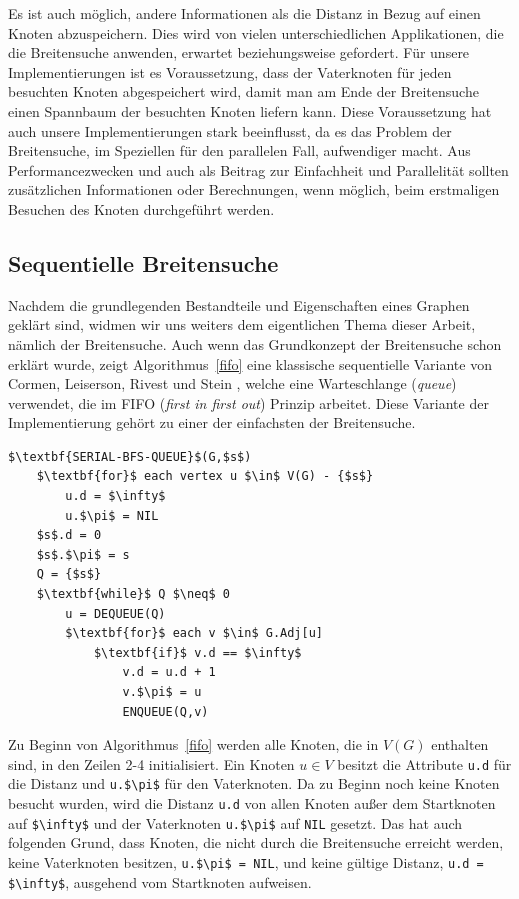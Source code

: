 \documentclass[11pt,a4paper]{article}
\begin{document}
Es ist auch möglich, andere Informationen als die Distanz in Bezug auf einen Knoten abzuspeichern. Dies wird von vielen unterschiedlichen Applikationen, die die Breitensuche anwenden, erwartet beziehungsweise gefordert. Für unsere Implementierungen ist es Voraussetzung, dass der Vaterknoten für jeden besuchten Knoten abgespeichert wird, damit man am Ende der Breitensuche einen Spannbaum der besuchten Knoten liefern kann. Diese Voraussetzung hat auch unsere Implementierungen stark beeinflusst, da es das Problem der Breitensuche, im Speziellen für den parallelen Fall, aufwendiger macht. Aus Performancezwecken und auch als Beitrag zur Einfachheit und Parallelität sollten zusätzlichen Informationen oder Berechnungen, wenn möglich, beim erstmaligen Besuchen des Knoten durchgeführt werden.
\subsection{Sequentielle Breitensuche}
Nachdem die grundlegenden Bestandteile und Eigenschaften eines Graphen geklärt sind, widmen wir uns weiters dem eigentlichen Thema dieser Arbeit, nämlich der Breitensuche. Auch wenn das Grundkonzept der Breitensuche schon erklärt wurde, zeigt Algorithmus~\ref{fifo} eine klassische sequentielle Variante von Cormen, Leiserson, Rivest und Stein \cite{cormen_introduction_2009}, welche eine Warteschlange (\textit{queue}) verwendet, die im FIFO (\textit{first in first out}) Prinzip arbeitet. Diese Variante der Implementierung gehört zu einer der einfachsten der Breitensuche.
\begin{lstlisting}[caption={Klassische Variante der Breitensuche unter Verwendung einer FIFO Warteschlange als Datenstruktur. Wird auf einem Graph \(G\) mit Startknoten \(s \in V(G)\) angewandt. Der Algorithmus bestimmt die Distanz und den Vaterknoten von denjenigen Knoten, die ausgehend vom Startknoten erreichbar sind.},label=fifo]
$\textbf{SERIAL-BFS-QUEUE}$(G,$s$)
	$\textbf{for}$ each vertex u $\in$ V(G) - {$s$}
		u.d = $\infty$
		u.$\pi$ = NIL
	$s$.d = 0
	$s$.$\pi$ = s
	Q = {$s$}
	$\textbf{while}$ Q $\neq$ 0
		u = DEQUEUE(Q)
		$\textbf{for}$ each v $\in$ G.Adj[u]
			$\textbf{if}$ v.d == $\infty$
				v.d = u.d + 1
				v.$\pi$ = u
				ENQUEUE(Q,v)
\end{lstlisting}
Zu Beginn von Algorithmus~\ref{fifo} werden alle Knoten, die in \(V(G)\) enthalten sind, in den Zeilen 2-4 initialisiert. Ein Knoten \(u \in V\) besitzt die Attribute \lstinline{u.d} für die Distanz und \lstinline{u.$\pi$} für den Vaterknoten. Da zu Beginn noch keine Knoten besucht wurden, wird die Distanz \lstinline{u.d} von allen Knoten außer dem Startknoten auf \lstinline{$\infty$} und der Vaterknoten \lstinline{u.$\pi$} auf \lstinline{NIL} gesetzt. Das hat auch folgenden Grund, dass Knoten, die nicht durch die Breitensuche erreicht werden, keine Vaterknoten besitzen, \lstinline{u.$\pi$ = NIL}, und keine gültige Distanz, \lstinline{u.d = $\infty$}, ausgehend vom Startknoten aufweisen.\\
\end{document}
